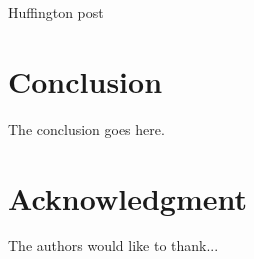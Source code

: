 \documentclass[conference]{IEEEtran}\usepackage[]{graphicx}\usepackage[]{color}
\begin{document}
Huffington post


\section{Conclusion}
The conclusion goes here.






\section*{Acknowledgment}


The authors would like to thank...







% 
% 




% 



\end{document}
